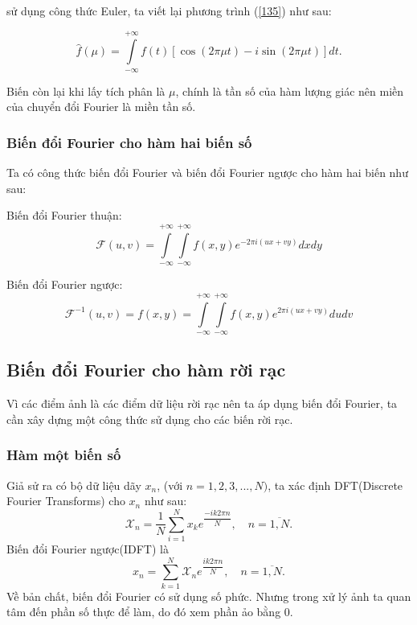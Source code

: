 \documentclass[12pt,a4paper]{report}
\numberwithin{equation}{section}
\theoremstyle{definition} %
\begin{document}
sử dụng công thức Euler, ta viết lại phương trình (\ref{135}) như sau:

\begin{equation}
	\label{137}
     \hat{f}(\mu)=\int\limits_{-\infty}^{+\infty}f(t)[\cos(2\pi\mu t)-i\sin(2\pi\mu t)]dt.
\end{equation}

Biến còn lại khi lấy tích phân là $\mu$, chính là tần số của hàm lượng giác nên miền của chuyển đổi Fourier là miền tần số.

\subsubsection{Biến đổi Fourier cho hàm hai biến số}

Ta có công thức biến đổi Fourier và biến đổi Fourier ngược cho hàm hai biến như sau:

Biến đổi Fourier thuận:
\begin{equation}
\mathcal{F}(u,v) = \int\limits_{-\infty}^{+\infty}\int\limits_{-\infty}^{+\infty}f(x,y)e^{-2\pi i(ux+vy)}dxdy
\end{equation}

Biến đổi Fourier ngược:
\begin{equation}
\mathcal{F}^{-1}(u,v) =f(x,y)= \int\limits_{-\infty}^{+\infty}\int\limits_{-\infty}^{+\infty}f(x,y)e^{2\pi i(ux+vy)}dudv
\end{equation}



\subsection{Biến đổi Fourier cho hàm rời rạc}

Vì các điểm ảnh là các điểm dữ liệu rời rạc nên ta áp dụng biến đổi Fourier, ta cần xây dựng một công thức sử dụng cho các biến rời rạc.

\subsubsection{Hàm một biến số}

Giả sử ra có bộ dữ liệu dãy $x_n$, (với $n= 1,2,3,...,N)$, ta xác định DFT(Discrete Fourier Transforms) cho $x_n$ như sau: 
\begin{equation}
	\label{144}
    \mathcal{X}_n= \dfrac{1}{N}\sum_{i=1}^Nx_ke^{\dfrac{-ik2\pi n}{N}},\quad n=\overline{1,N}.
\end{equation}
Biến đổi Fourier ngược(IDFT) là
\begin{equation}
	\label{145}
    x_n =\sum_{k=1}^N\mathcal{X}_ne^{\dfrac{ik2\pi n}{N}},\quad n=\overline{1,N}.
\end{equation}
Về bản chất, biến đổi Fourier có sử dụng số phức. Nhưng trong xử lý ảnh ta quan tâm đến phần số thực để làm, do đó xem phần ảo bằng $0$.
\end{document}

